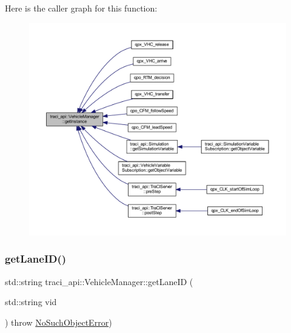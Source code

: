 Here is the caller graph for this function\+:\nopagebreak
\begin{figure}[H]
\begin{center}
\leavevmode
\includegraphics[width=350pt]{classtraci__api_1_1_vehicle_manager_a2f2e2b5647eda9af94094da62788cd2e_icgraph}
\end{center}
\end{figure}
\mbox{\label{classtraci__api_1_1_vehicle_manager_a5cf2db6460fa94ccb2b3d489369b7d0e}} 
\subsubsection{\texorpdfstring{get\+Lane\+I\+D()}{getLaneID()}}
{\footnotesize\ttfamily std\+::string traci\+\_\+api\+::\+Vehicle\+Manager\+::get\+Lane\+ID (\begin{DoxyParamCaption}\item[{std\+::string}]{vid }\end{DoxyParamCaption}) throw  \hyperlink{classtraci__api_1_1_no_such_object_error}{No\+Such\+Object\+Error}) }

